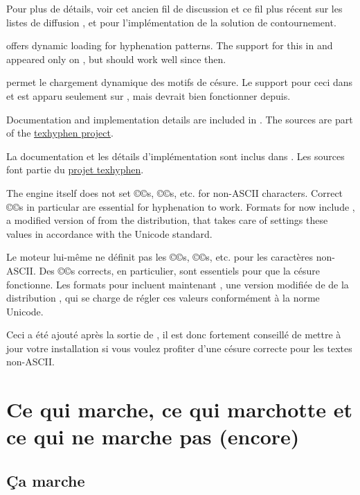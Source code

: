 \documentclass{lltxdoc}
\begin{document}
{Pour plus de détails, voir cet ancien fil de discussion et ce fil plus récent sur les listes de diffusion \luatex, et  pour l'implémentation de la solution de contournement.

\luatex offers dynamic loading for hyphenation patterns. The support for this in
 and  appeared only on , but should
work well since then.

\luatex permet le chargement dynamique des motifs de césure. Le support pour ceci dans  et  est apparu seulement sur , mais devrait bien fonctionner depuis.

Documentation and implementation details are included in
. The sources are part of the
\href{http://tug.org/tex-hyphen/}{texhyphen project}.

La documentation et les détails d'implémentation sont inclus dans . Les sources font partie du \href{http://tug.org/tex-hyphen/}{projet texhyphen}.

The engine itself does not set ©\catcode©s, ©\lccode©s, etc. for non-ASCII
characters. Correct ©\lccode©s in particular are essential for hyphenation to
work. Formats for \luatex now include , a
modified version of  from the \xetex distribution,
that takes care of settings these values in accordance with the Unicode
standard.

Le moteur lui-même ne définit pas les ©\catcode©s, ©\lccode©s, etc. pour les caractères non-ASCII. Des ©\lccode©s corrects, en particulier, sont essentiels pour que la césure fonctionne. Les formats pour \luatex incluent maintenant , une version modifiée de  de la distribution \xetex, qui se charge de régler ces valeurs conformément à la norme Unicode.

Ceci a été ajouté après la sortie de , il est donc fortement conseillé
de mettre à jour votre installation si vous voulez profiter d'une césure correcte
pour les textes non-ASCII.


\section{Ce qui marche, ce qui marchotte et ce qui ne marche pas (encore)}\label{workornot}

\subsection{Ça marche}\label{working}

}
\end{document}
